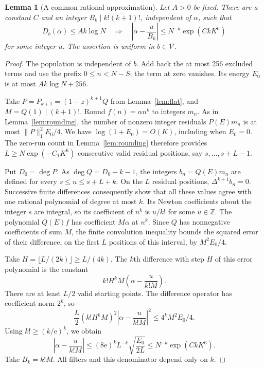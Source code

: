 \documentclass[11pt]{amsart}
\numberwithin{equation}{section}
\newtheorem{lemma}[theorem]{Lemma}
\theoremstyle{remark}
\newcommand{\Z}{\mathbb Z}
\newcommand{\e}{\mathrm e}
\newcommand{\normone}[1]{\lVert #1\rVert_1}
\begin{document}
\begin{lemma}[A common rational approximation]\label{lem:inverse}
Let \(A>0\) be fixed. There are a constant \(C\) and an integer
\(B_k\mid k!(k+1)!\), independent of \(\alpha\), such that
\[
 D_b(\alpha)\le Ak\log N
 \quad\Longrightarrow\quad
 \left|\alpha-\frac u{B_k}\right|
 \le N^{-k}\exp(CkK^6)
\]
for some integer \(u\). The assertion is uniform in \(b\in\mathcal V\).
\end{lemma}
\begin{proof}
The population is independent of \(b\). Add back the at most 256 excluded
terms and use the prefix \(0\le n<N-S\); the term at zero vanishes.
Its energy \(E_0\) is at most \(Ak\log N+256\).

Take \(P=P_{k+1}=(1-z)^{k+1}Q\) from Lemma~\ref{lem:flat}, and
\(M=Q(1)\mid(k+1)!\).
Round \(f(n)=\alpha n^k\) to integers \(m_n\).
As in Lemma~\ref{lem:rounding}, the number of nonzero integer residuals
\(P(E)m_n\) is at most \(\normone P^2E_0/4\).
We have \(\log(1+E_0)=O(K)\), including when \(E_0=0\).
The zero-run count in Lemma~\ref{lem:rounding} therefore provides
\(L\ge N\exp(-C_1K^6)\) consecutive valid residual positions,
say \(s,\ldots,s+L-1\).

Put \(D_0=\deg P\). As \(\deg Q=D_0-k-1\), the integers
\(b_n=Q(E)m_n\) are defined for every
\(s\le n\le s+L+k\). On the \(L\) residual positions,
\(\Delta^{k+1}b_n=0\).
Successive finite differences consequently show that all these
values agree with one rational polynomial of degree at most \(k\).
Its Newton coefficients about the integer \(s\) are integral, so
its coefficient of \(n^k\) is \(u/k!\) for some \(u\in\Z\).
The polynomial \(Q(E)f\) has coefficient \(M\alpha\) at \(n^k\).
Since \(Q\) has nonnegative coefficients of sum \(M\), the finite
convolution inequality bounds the squared error of their difference,
on the first \(L\) positions of this interval, by \(M^2E_0/4\).

Take \(H=\lfloor L/(2k)\rfloor\ge L/(4k)\).
The \(k\)th difference with step \(H\) of this error polynomial is the
constant
\[
 k!H^kM\left(\alpha-\frac u{k!M}\right).
\]
There are at least \(L/2\) valid starting points. The difference operator
has coefficient norm \(2^k\), so
\[
 \frac L2(k!H^kM)^2
 \left|\alpha-\frac u{k!M}\right|^2
 \le4^kM^2E_0/4.
\]
Using \(k!\ge(k/\e)^k\), we obtain
\[
 \left|\alpha-\frac u{k!M}\right|
 \le(8\e)^k L^{-k}\sqrt{\frac{E_0}{2L}}
 \le N^{-k}\exp(CkK^6).
\]
Take \(B_k=k!M\). All filters and this denominator depend only on \(k\).
\end{proof}
\end{document}
